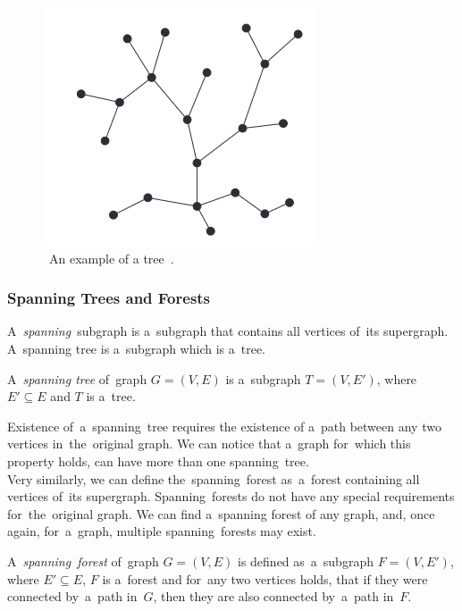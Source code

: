 \begin{figure}[h]
    \centering
    \includegraphics[width=0.5\linewidth]{tree_example.png}
    \caption[An example of a tree]{~An example of a tree~\cite{Diestel}.}
    \label{fig:tree_visualization}
\end{figure}

\subsubsection{Spanning Trees and Forests}
A~\textit{spanning}~subgraph is a~subgraph that contains all vertices of~its supergraph. A~spanning tree is a~subgraph which is a~tree.
\begin{definition}
    A~\emph{spanning tree} of~graph $G = (V, E)$ is a~subgraph ${T = (V, E')}$, where $E' \subseteq E$ and $T$ is a~tree.
\end{definition}
Existence of~a~spanning~tree requires the existence of a~path between any two vertices in~the~original graph. We can notice that a~graph for~which this property holds, can have more than one spanning~tree. \\
Very similarly, we can define the~spanning~forest as~a~forest containing all vertices of~its supergraph. Spanning~forests do not have any special requirements for~the~original graph. We can find a~spanning forest of any graph, and, once again, for~a~graph, multiple spanning~forests may exist.
\begin{definition}
    A~\emph{spanning~forest} of~graph $G = (V, E)$ is defined as~a~subgraph $F = (V, E')$, where $E' \subseteq E$, $F$ is a~forest and for~any two vertices holds, that if they were connected by~a~path in~$G$, then they are also connected by~a~path in~$F$. 
\end{definition}

